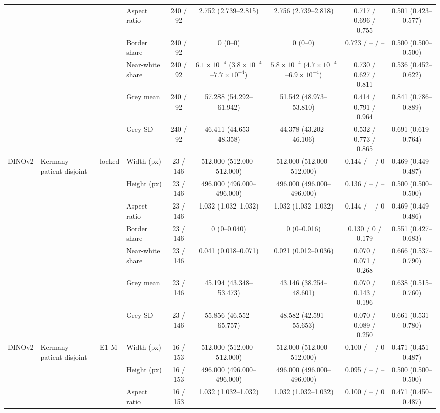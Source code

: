 \begin{longtable}{@{}llllccccc@{}}
 &  &  & Aspect ratio & 240 / 92 & 2.752 (2.739--2.815) & 2.756 (2.739--2.818) & 0.717 / 0.696 / 0.755 & 0.501 (0.423--0.577) \\
 &  &  & Border share & 240 / 92 & 0 (0--0) & 0 (0--0) & 0.723 / -- / -- & 0.500 (0.500--0.500) \\
 &  &  & Near-white share & 240 / 92 & $6.1\times10^{-4}$ ($3.8\times10^{-4}$--$7.7\times10^{-4}$) & $5.8\times10^{-4}$ ($4.7\times10^{-4}$--$6.9\times10^{-4}$) & 0.730 / 0.627 / 0.811 & 0.536 (0.452--0.622) \\
 &  &  & Grey mean & 240 / 92 & 57.288 (54.292--61.942) & 51.542 (48.973--53.810) & 0.414 / 0.791 / 0.964 & 0.841 (0.786--0.889) \\
 &  &  & Grey SD & 240 / 92 & 46.411 (44.653--48.358) & 44.378 (43.202--46.106) & 0.532 / 0.773 / 0.865 & 0.691 (0.619--0.764) \\
\addlinespace[1pt]
DINOv2 & Kermany patient-disjoint & locked & Width (px) & 23 / 146 & 512.000 (512.000--512.000) & 512.000 (512.000--512.000) & 0.144 / -- / 0 & 0.469 (0.449--0.487) \\
 &  &  & Height (px) & 23 / 146 & 496.000 (496.000--496.000) & 496.000 (496.000--496.000) & 0.136 / -- / -- & 0.500 (0.500--0.500) \\
 &  &  & Aspect ratio & 23 / 146 & 1.032 (1.032--1.032) & 1.032 (1.032--1.032) & 0.144 / -- / 0 & 0.469 (0.449--0.486) \\
 &  &  & Border share & 23 / 146 & 0 (0--0.040) & 0 (0--0.016) & 0.130 / 0 / 0.179 & 0.551 (0.427--0.683) \\
 &  &  & Near-white share & 23 / 146 & 0.041 (0.018--0.071) & 0.021 (0.012--0.036) & 0.070 / 0.071 / 0.268 & 0.666 (0.537--0.790) \\
 &  &  & Grey mean & 23 / 146 & 45.194 (43.348--53.473) & 43.146 (38.254--48.601) & 0.070 / 0.143 / 0.196 & 0.638 (0.515--0.760) \\
 &  &  & Grey SD & 23 / 146 & 55.856 (46.552--65.757) & 48.582 (42.591--55.653) & 0.070 / 0.089 / 0.250 & 0.661 (0.531--0.780) \\
\addlinespace[1pt]
DINOv2 & Kermany patient-disjoint & E1-M & Width (px) & 16 / 153 & 512.000 (512.000--512.000) & 512.000 (512.000--512.000) & 0.100 / -- / 0 & 0.471 (0.451--0.487) \\
 &  &  & Height (px) & 16 / 153 & 496.000 (496.000--496.000) & 496.000 (496.000--496.000) & 0.095 / -- / -- & 0.500 (0.500--0.500) \\
 &  &  & Aspect ratio & 16 / 153 & 1.032 (1.032--1.032) & 1.032 (1.032--1.032) & 0.100 / -- / 0 & 0.471 (0.450--0.487) \\

\end{longtable}
